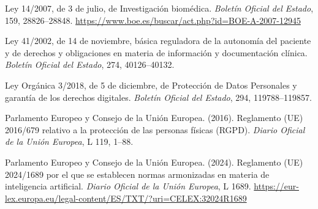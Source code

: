 \documentclass[11pt,a4paper]{article}
\begin{document}
\vspace{0.5em}
\noindent Ley 14/2007, de 3 de julio, de Investigación biomédica. \textit{Boletín Oficial del Estado}, 159, 28826--28848. \url{https://www.boe.es/buscar/act.php?id=BOE-A-2007-12945}

\noindent Ley 41/2002, de 14 de noviembre, básica reguladora de la autonomía del paciente y de derechos y obligaciones en materia de información y documentación clínica. \textit{Boletín Oficial del Estado}, 274, 40126--40132.

\noindent Ley Orgánica 3/2018, de 5 de diciembre, de Protección de Datos Personales y garantía de los derechos digitales. \textit{Boletín Oficial del Estado}, 294, 119788--119857.

\noindent Parlamento Europeo y Consejo de la Unión Europea. (2016). Reglamento (UE) 2016/679 relativo a la protección de las personas físicas (RGPD). \textit{Diario Oficial de la Unión Europea}, L 119, 1--88.

\noindent Parlamento Europeo y Consejo de la Unión Europea. (2024). Reglamento (UE) 2024/1689 por el que se establecen normas armonizadas en materia de inteligencia artificial. \textit{Diario Oficial de la Unión Europea}, L 1689. \url{https://eur-lex.europa.eu/legal-content/ES/TXT/?uri=CELEX:32024R1689}
\end{document}
